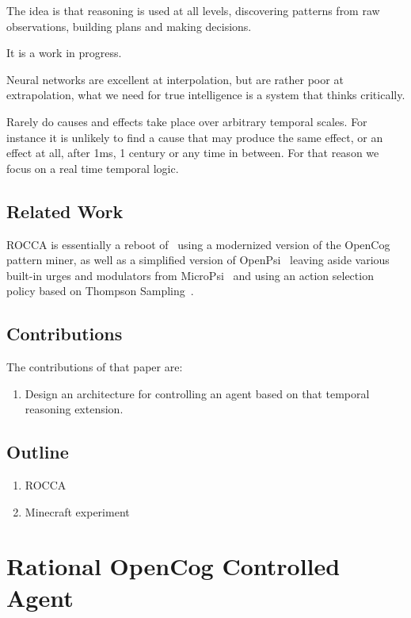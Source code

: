 \documentclass[runningheads]{llncs}
\begin{document}
The idea is that reasoning is used at all levels, discovering patterns
from raw observations, building plans and making decisions.

It is a work in progress.

Neural networks are excellent at interpolation, but are rather poor at
extrapolation, what we need for true intelligence is a system that
thinks critically.

Rarely do causes and effects take place over arbitrary temporal
scales.  For instance it is unlikely to find a cause that may produce
the same effect, or an effect at all, after 1ms, 1 century or any time
in between.  For that reason we focus on a real time temporal logic.

\subsection{Related Work}

ROCCA is essentially a reboot of~\cite{Goertzel2011} using a
modernized version of the OpenCog pattern miner, as well as a
simplified version of OpenPsi~\cite{Cai2011, Cai2013} leaving aside
various built-in urges and modulators from MicroPsi~\cite{Bach2012}
and using an action selection policy based on Thompson
Sampling~\cite{Leike2016}.

\subsection{Contributions}

The contributions of that paper are:
\begin{enumerate}
\item Design an architecture for controlling an agent based on that
  temporal reasoning extension.
\end{enumerate}

\subsection{Outline}

\begin{enumerate}
\item ROCCA
\item Minecraft experiment
\end{enumerate}

\section{Rational OpenCog Controlled Agent}
\end{document}
